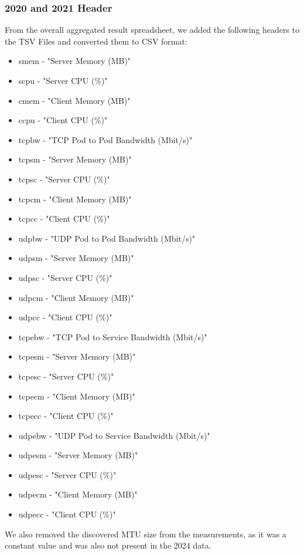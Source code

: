 \subsubsection{2020 and 2021 Header}

From the overall aggregated result spreadsheet, we added the following headers to the TSV Files and converted them to CSV format:

\begin{itemize}
    \item smem - "Server Memory (MB)"
    \item scpu - "Server CPU (\%)"
    \item cmem - "Client Memory (MB)"
    \item ccpu - "Client CPU (\%)"
    \item tcpbw - "TCP Pod to Pod Bandwidth (Mbit/s)"
    \item tcpsm - "Server Memory (MB)"
    \item tcpsc - "Server CPU (\%)"
    \item tcpcm - "Client Memory (MB)"
    \item tcpcc - "Client CPU (\%)"
    \item udpbw - "UDP Pod to Pod Bandwidth (Mbit/s)"
    \item udpsm - "Server Memory (MB)"
    \item udpsc - "Server CPU (\%)"
    \item udpcm - "Client Memory (MB)"
    \item udpcc - "Client CPU (\%)"
    \item tcpebw - "TCP Pod to Service Bandwidth (Mbit/s)"
    \item tcpesm - "Server Memory (MB)"
    \item tcpesc - "Server CPU (\%)"
    \item tcpecm - "Client Memory (MB)"
    \item tcpecc - "Client CPU (\%)"
    \item udpebw - "UDP Pod to Service Bandwidth (Mbit/s)"
    \item udpesm - "Server Memory (MB)"
    \item udpesc - "Server CPU (\%)"
    \item udpecm - "Client Memory (MB)"
    \item udpecc - "Client CPU (\%)"
\end{itemize}

We also removed the discovered MTU size from the measurements, as it was a constant value and was also not present in the 2024 data.

